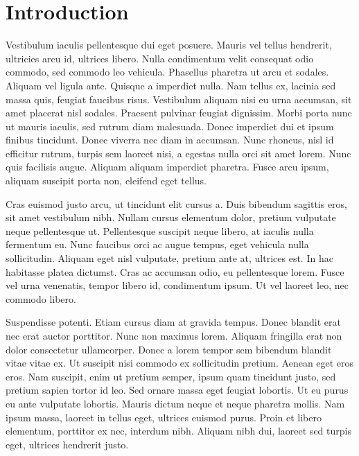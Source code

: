 \section{Introduction}%
Vestibulum iaculis pellentesque dui eget posuere. Mauris vel tellus hendrerit, ultricies arcu id, ultrices libero. Nulla condimentum velit consequat odio commodo, sed commodo leo vehicula. Phasellus pharetra ut arcu et sodales. Aliquam vel ligula ante. Quisque a imperdiet nulla. Nam tellus ex, lacinia sed massa quis, feugiat faucibus risus. Vestibulum aliquam nisi eu urna accumsan, sit amet placerat nisl sodales. Praesent pulvinar feugiat dignissim. Morbi porta nunc ut mauris iaculis, sed rutrum diam malesuada. Donec imperdiet dui et ipsum finibus tincidunt. Donec viverra nec diam in accumsan. Nunc rhoncus, nisl id efficitur rutrum, turpis sem laoreet nisi, a egestas nulla orci sit amet lorem. Nunc quis facilisis augue. Aliquam aliquam imperdiet pharetra. Fusce arcu ipsum, aliquam suscipit porta non, eleifend eget tellus.

Cras euismod justo arcu, ut tincidunt elit cursus a. Duis bibendum sagittis eros, sit amet vestibulum nibh. Nullam cursus elementum dolor, pretium vulputate neque pellentesque ut. Pellentesque suscipit neque libero, at iaculis nulla fermentum eu. Nunc faucibus orci ac augue tempus, eget vehicula nulla sollicitudin. Aliquam eget nisl vulputate, pretium ante at, ultrices est. In hac habitasse platea dictumst. Cras ac accumsan odio, eu pellentesque lorem. Fusce vel urna venenatis, tempor libero id, condimentum ipsum. Ut vel laoreet leo, nec commodo libero.

Suspendisse potenti. Etiam cursus diam at gravida tempus. Donec blandit erat nec erat auctor porttitor. Nunc non maximus lorem. Aliquam fringilla erat non dolor consectetur ullamcorper. Donec a lorem tempor sem bibendum blandit vitae vitae ex. Ut suscipit nisi commodo ex sollicitudin pretium. Aenean eget eros eros. Nam suscipit, enim ut pretium semper, ipsum quam tincidunt justo, sed pretium sapien tortor id leo. Sed ornare massa eget feugiat lobortis. Ut eu purus eu ante vulputate lobortis. Mauris dictum neque et neque pharetra mollis. Nam ipsum massa, laoreet in tellus eget, ultrices euismod purus. Proin et libero elementum, porttitor ex nec, interdum nibh. Aliquam nibh dui, laoreet sed turpis eget, ultrices hendrerit justo. 